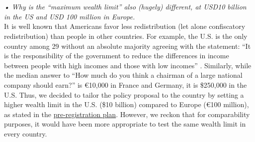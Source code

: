 \documentclass[12pt,english]{article}
\begin{document}
~\\ ~\\



\textit{• Why is the “maximum wealth limit” also (hugely) different, at USD10 billion in the US and USD 100 million in Europe.} ~\\

It is well known that Americans favor less redistribution (let alone confiscatory redistribution) than people in other countries. For example, the U.S. is the only country among 29 without an absolute majority agreeing with the statement: ``It is the responsibility of the government to reduce the differences in income between people with high incomes and those with low incomes'' \citep{issp_international_2019}. Similarly, while the median answer to ``How much do you think a chairman of a large national company should earn?'' is \euro{}10,000 in France and Germany, it is \$250,000 in the U.S. Thus, we decided to tailor the policy proposal to the country by setting a higher wealth limit in the U.S. (\$10 billion) compared to Europe (\euro{}100 million), as stated in the \href{https://osf.io/2b6vq}{pre-registration plan}. However, we reckon that for comparability purposes, it would have been more appropriate to test the same wealth limit in every country.
~\\ ~\\
\end{document}
